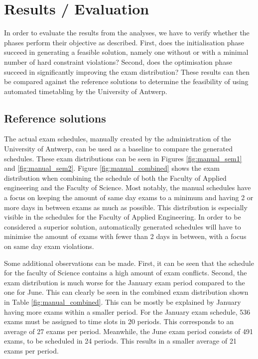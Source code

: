 
\section{Results / Evaluation}\label{sec:results}

In order to evaluate the results from the analyses, we have to verify whether the phases perform their objective as described. First, does the initialisation phase succeed in generating a feasible solution, namely one without or with a minimal number of hard constraint violations? Second, does the optimisation phase succeed in significantly improving the exam distribution? These results can then be compared against the reference solutions to determine the feasibility of using automated timetabling by the University of Antwerp.

\subsection{Reference solutions}

The actual exam schedules, manually created by the administration of the University of Antwerp, can be used as a baseline to compare the generated schedules. These exam distributions can be seen in Figures \ref{fig:manual_sem1} and \ref{fig:manual_sem2}. Figure \ref{fig:manual_combined} shows the exam distribution when combining the schedule of both the Faculty of Applied engineering and the Faculty of  Science. Most notably, the manual schedules have a focus on keeping the amount of same day exams to a minimum and having 2 or more days in between exams as much as possible. This distribution is especially visible in the schedules for the Faculty of Applied Engineering. In order to be considered a superior solution, automatically generated schedules will have to minimise the amount of exams with fewer than 2 days in between, with a focus on same day exam violations.

Some additional observations can be made. First, it can be seen that the schedule for the faculty of Science contains a high amount of exam conflicts. Second, the exam distribution is much worse for the January exam period compared to the one for June. This can clearly be seen in the combined exam distribution shown in Table \ref{fig:manual_combined}. This can be mostly be explained by January having more exams within a smaller period. For the January exam schedule, 536 exams must be assigned to time slots in 20 periods. This corresponds to an average of 27 exams per period. Meanwhile, the June exam period consists of 491 exams, to be scheduled in 24 periods. This results in a smaller average of 21 exams per period.


